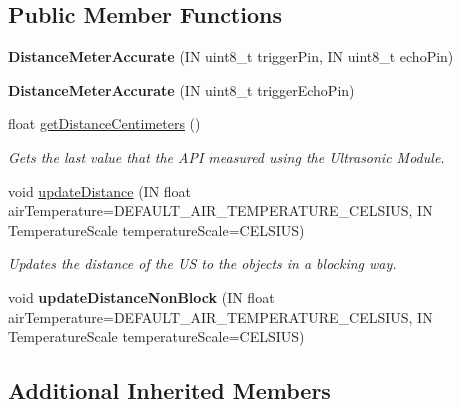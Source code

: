 \subsection*{Public Member Functions}
\begin{DoxyCompactItemize}
\item 
\mbox{\label{class_easyuino_1_1_distance_meter_accurate_a57f810d7e6653028bc23139e703985d7}} 
{\bfseries Distance\+Meter\+Accurate} (IN uint8\+\_\+t trigger\+Pin, IN uint8\+\_\+t echo\+Pin)
\item 
\mbox{\label{class_easyuino_1_1_distance_meter_accurate_a6e58a043f9d28dd6c7e4c5b819607341}} 
{\bfseries Distance\+Meter\+Accurate} (IN uint8\+\_\+t trigger\+Echo\+Pin)
\item 
float \hyperlink{class_easyuino_1_1_distance_meter_accurate_a4de44a347db0bebbf5d74f12397cd4d9}{get\+Distance\+Centimeters} ()
\begin{DoxyCompactList}\small\item\em Gets the last value that the A\+PI measured using the Ultrasonic Module. \end{DoxyCompactList}\item 
void \hyperlink{class_easyuino_1_1_distance_meter_accurate_af7c43ebaa1ae75db2f806dc7039c8a82}{update\+Distance} (IN float air\+Temperature=D\+E\+F\+A\+U\+L\+T\+\_\+\+A\+I\+R\+\_\+\+T\+E\+M\+P\+E\+R\+A\+T\+U\+R\+E\+\_\+\+C\+E\+L\+S\+I\+US, IN Temperature\+Scale temperature\+Scale=C\+E\+L\+S\+I\+US)
\begin{DoxyCompactList}\small\item\em Updates the distance of the US to the objects in a blocking way. \end{DoxyCompactList}\item 
\mbox{\label{class_easyuino_1_1_distance_meter_accurate_ac428b0dfd816862fab277b2da1f0c164}} 
void {\bfseries update\+Distance\+Non\+Block} (IN float air\+Temperature=D\+E\+F\+A\+U\+L\+T\+\_\+\+A\+I\+R\+\_\+\+T\+E\+M\+P\+E\+R\+A\+T\+U\+R\+E\+\_\+\+C\+E\+L\+S\+I\+US, IN Temperature\+Scale temperature\+Scale=C\+E\+L\+S\+I\+US)
\end{DoxyCompactItemize}
\subsection*{Additional Inherited Members}


